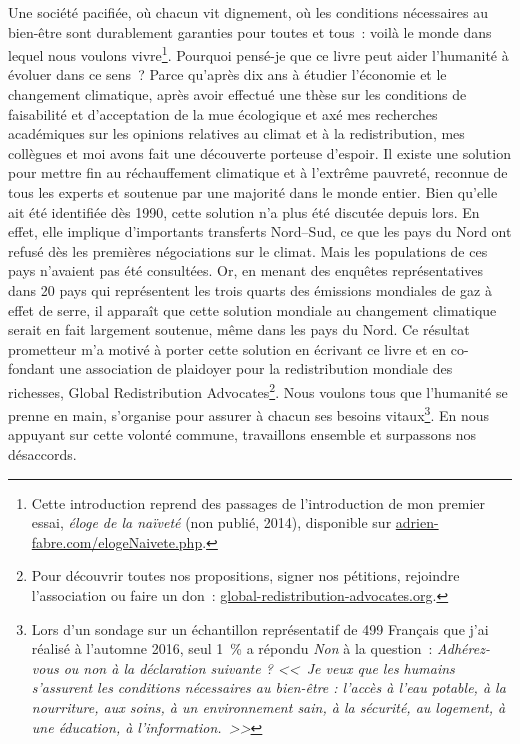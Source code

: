 \documentclass[a5paper,french,openany]{memoir}
\begin{document}
Une société pacifiée, où chacun vit dignement, où les conditions nécessaires au bien-être sont durablement garanties pour toutes et tous~: voilà le monde dans lequel nous voulons vivre\footnote{Cette introduction reprend des passages de l'introduction de mon premier essai, \textit{éloge de la naïveté} (non publié, 2014), disponible sur \href{https://adrien-fabre.com/elogeNaivete.php}{adrien-fabre.com/elogeNaivete.php}.}. Pourquoi pensé-je que ce livre peut aider l'humanité à évoluer dans ce sens~? Parce qu'après dix ans à étudier l'économie et le changement climatique, après avoir effectué une thèse sur les conditions de faisabilité et d'acceptation de la mue écologique et axé mes recherches académiques sur les opinions relatives au climat et à la redistribution, mes collègues et moi avons fait une découverte porteuse d'espoir. %
Il existe une solution pour mettre fin au réchauffement climatique et à l'extrême pauvreté, reconnue de %
tous les experts et soutenue par une majorité dans le monde entier. 
Bien qu'elle ait été identifiée dès 1990, cette solution n'a plus été discutée %
depuis lors. En effet, elle implique d'importants transferts Nord--Sud, ce que les pays du Nord ont refusé dès les premières négociations sur le climat. Mais les populations de ces pays n'avaient pas été consultées. Or, en menant des enquêtes représentatives dans 20 pays qui représentent les trois quarts des émissions mondiales de gaz à effet de serre, il apparaît que cette solution mondiale au changement climatique serait en fait largement soutenue, même dans les pays du Nord. 
Ce résultat prometteur m'a motivé à porter cette solution en écrivant ce livre et en co-fondant une association de plaidoyer pour la redistribution mondiale des richesses, Global Redistribution Advocates\footnote{Pour découvrir toutes nos propositions, signer nos pétitions, rejoindre l'association ou faire un don~: \href{http://global-redistribution-advocates.org/}{global-redistribution-advocates.org}.}. %
Nous voulons tous que l'humanité se prenne en main, s'organise 
pour assurer à chacun ses besoins vitaux\footnote{Lors d'un sondage sur un échantillon représentatif de 499 %
Français que j'ai réalisé à l'automne 2016, seul 1~\% a répondu \textit{Non} à la question~: \textit{Adhérez-vous ou non à la déclaration suivante ? <<~Je veux que les humains s'assurent les conditions nécessaires au bien-être : l'accès à l'eau potable, à la nourriture, aux soins, à un environnement sain, à la sécurité, au logement, à une éducation, à l'information.~>>}}. 
En nous appuyant sur cette volonté commune, travaillons ensemble et surpassons nos désaccords.
\end{document}
